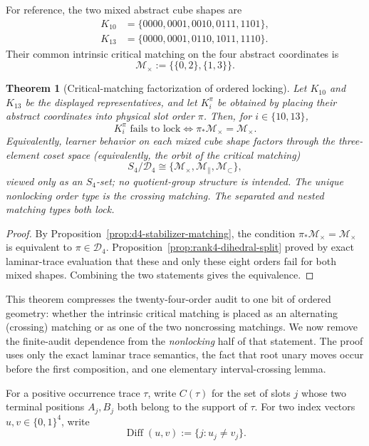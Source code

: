 \documentclass[11pt]{article}
\newtheorem{theorem}[definition]{Theorem}
\begin{document}
For reference, the two mixed abstract cube shapes are
\[
 \begin{aligned}
 K_{10}&=\{0000,0001,0010,0111,1101\},\\
 K_{13}&=\{0000,0001,0110,1011,1110\}.
 \end{aligned}
\]
Their common intrinsic critical matching on the four abstract coordinates is
\[
  \mathcal M_{\times}:=\bigl\{\{0,2\},\{1,3\}\bigr\}.
\]

\begin{theorem}[Critical-matching factorization of ordered locking]
\label{thm:critical-matching-factorization}
Let $K_{10}$ and $K_{13}$ be the displayed representatives, and let $K_i^{\pi}$
be obtained by placing their abstract coordinates into physical slot order
$\pi$.  Then, for $i\in\{10,13\}$,
\[
 \boxed{
 K_i^{\pi}\text{ fails to lock}
 \iff
 \pi_*\mathcal M_{\times}=\mathcal M_{\times}.
 }
\]
Equivalently, learner behavior on each mixed cube shape factors through the
three-element coset space (equivalently, the orbit of the critical matching)
\[
 S_4/\mathcal D_4
 \cong
 \{\mathcal M_{\times},\mathcal M_{\parallel},
     \mathcal M_{\subset}\},
\]
viewed only as an $S_4$-set; no quotient-group structure is intended.
The unique nonlocking order type is the crossing matching.  The separated
and nested matching types both lock.
\end{theorem}

\begin{proof}
By Proposition~\ref{prop:d4-stabilizer-matching}, the condition
$\pi_*\mathcal M_{\times}=\mathcal M_{\times}$ is equivalent to
$\pi\in\mathcal D_4$.  Proposition~\ref{prop:rank4-dihedral-split} proved by
exact laminar-trace evaluation that these and only these eight orders fail for
both mixed shapes.  Combining the two statements gives the equivalence.
\end{proof}


This theorem compresses the twenty-four-order audit to one bit of ordered
geometry: whether the intrinsic critical matching is placed as an alternating
(crossing) matching or as one of the two noncrossing matchings.  We now remove
the finite-audit dependence from the \emph{nonlocking} half of that statement.
The proof uses only the exact laminar trace semantics, the fact that root unary
moves occur before the first composition, and one elementary interval-crossing
lemma.

For a positive occurrence trace $\tau$, write $C(\tau)$ for the set of slots
$j$ whose two terminal positions $A_j,B_j$ both belong to the support of
$\tau$.  For two index vectors $u,v\in\{0,1\}^4$, write
\[
  \operatorname{Diff}(u,v):=\{j:u_j\ne v_j\}.
\]
\end{document}
